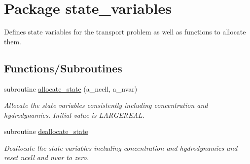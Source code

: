 \hypertarget{a00070}{
\section{Package state\_\-variables}
\label{a00070}
}
Defines state variables for the transport problem as well as functions to allocate them.  


\subsection*{Functions/Subroutines}
\begin{CompactItemize}
\item 
subroutine \hyperlink{a00070_02b466d6d8eb478ddb781a15f2d9c6d8}{allocate\_\-state} (a\_\-ncell, a\_\-nvar)
\begin{CompactList}\small\item\em Allocate the state variables consistently including concentration and hydrodynamics. Initial value is LARGEREAL. \item\end{CompactList}\item 
\hypertarget{a00070_727b2297ee7c0a3753d479272028937a}{
subroutine \hyperlink{a00070_727b2297ee7c0a3753d479272028937a}{deallocate\_\-state}}
\label{a00070_727b2297ee7c0a3753d479272028937a}

\begin{CompactList}\small\item\em Deallocate the state variables including concentration and hydrodynamics and reset ncell and nvar to zero. \item\end{CompactList}\end{CompactItemize}
